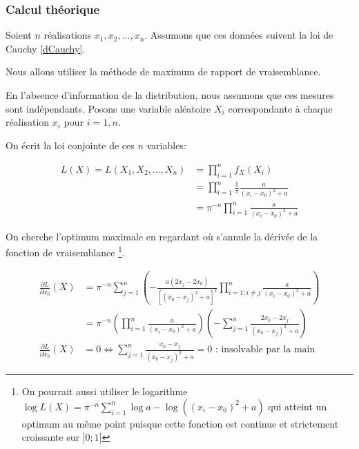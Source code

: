 \documentclass[12pt,a4paper,titlepage]{article}
\numberwithin{equation}{section}
\begin{document}
\subsubsection*{Calcul théorique}

Soient $n$ réalisations $x_1, x_2, ..., x_n$. Assumons que ces données suivent la loi de Cauchy \eqref{dCauchy}.

Nous allons utiliser la méthode de maximum de rapport de vraisemblance.

En l'absence d'information de la distribution, nous assumons que ces mesures sont indépendants. Posons une variable aléatoire $X_i$ correspondante à chaque réalisation $x_i$ pour $i=\overline{1, n}$.

On écrit la loi conjointe de ces $n$ variables:

\begin{align*}
L (X) = L\left( {{X_1},{X_2},...,{X_n}} \right) & = \prod\limits_{i = 1}^n {{f_X}\left( {{X_i}} \right)} \\
& = \prod\limits_{i = 1}^n {\frac{1}{\pi }\frac{a}{{{{\left( {{x_i} - {x_0}} \right)}^2} + a}}} \\
& = {\pi ^{ - n}}\prod\limits_{i = 1}^n {\frac{a}{{{{\left( {{x_i} - {x_0}} \right)}^2} + a}}}
\end{align*}

On cherche l'optimum maximale en regardant où s'annule la dérivée de la fonction de vraisemblance
\footnote{On pourrait aussi utiliser le logarithme $\log{L(X)} = \pi^{-n} \sum\limits_{i=1}^{n} \log{a} -
\log{((x_i-x_0)^2+a)}$ qui atteint un optimum au même point puisque cette fonction est continue et strictement croissante
sur $]0;1]$}.

\begin{align*}
\frac{{\partial L}}{{\partial {x_0}}}\left( X \right) & = {\pi ^{ - n}}\sum\limits_{j = 1}^n {\left( { - \frac{{a\left( {2{x_j} - 2{x_0}} \right)}}{{{{\left[ {{{\left( {{x_0} - {x_j}} \right)}^2} + a} \right]}^2}}}\prod\limits_{i = 1;i \ne j}^n {\frac{a}{{{{\left( {{x_i} - {x_0}} \right)}^2} + a}}} } \right)}\\
&  = {\pi ^{ - n}}\left( {\prod\limits_{i = 1}^n {\frac{a}{{{{\left( {{x_i} - {x_0}} \right)}^2} + a}}} } \right)\left( { - \sum\limits_{j = 1}^n {\frac{{2{x_0} - 2{x_j}}}{{{{\left( {{x_0} - {x_j}} \right)}^2} + a}}} } \right) \\
\frac{{\partial L}}{{\partial {x_0}}}\left( X \right) & = 0 \Leftrightarrow \sum\limits_{j = 1}^n {\frac{{{x_0} - {x_j}}}{{{{\left( {{x_0} - {x_j}} \right)}^2} + a}}}  = 0 \text{ : insolvable par la main}
\end{align*}
\end{document}
